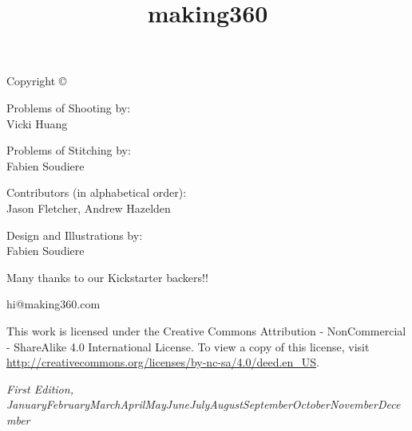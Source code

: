 \documentclass[notoc, justified]{tufte-book}
\title{making360} %
\author{} %
\newcommand{\monthyear}{\ifcase\month\or January\or February\or March\or April\or May\or June\or July\or August\or September\or October\or November\or December\fi\space\number\year} %
\begin{document}
\setlength{\parskip}{12pt}
\setlength{\parindent}{0pt}
\let\cleardoublepage\clearpage


\frontmatter


\maketitlepage


\newpage
\thispagestyle{empty}
\setlength{\parindent}{0pt}
\setlength{\parskip}{\baselineskip}
Copyright \copyright\ \the\year\ \thanklessauthor


\begin{fullwidth}

\par{Problems of Shooting by:
\\
Vicki Huang}

\par{Problems of Stitching by:
\\
Fabien Soudiere}

\par{Contributors (in alphabetical order):
\\
Jason Fletcher, Andrew Hazelden}

\par{Design and Illustrations by: 
\\
Fabien Soudiere}

\par{Many thanks to our Kickstarter backers!!}

\par{hi@making360.com}

\par This work is licensed under the Creative Commons Attribution - NonCommercial - ShareAlike 4.0 International License. To view a copy of this license, visit \url{http://creativecommons.org/licenses/by-nc-sa/4.0/deed.en_US}.

\par\textit{First Edition, \monthyear}
\end{fullwidth}
\clearpage


\end{document}
